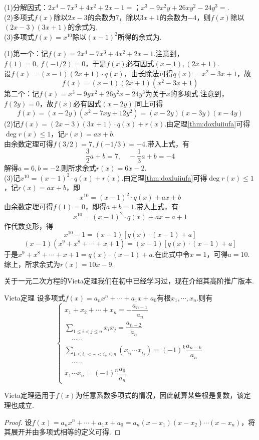 \documentclass[lang=cn, zihao=5]{elegantbook}
\newcommand{\tk}{\uline{\hspace{4em}}}
\begin{document}
\begin{example}
	(1)分解因式：$2x^4-7x^3+4x^2+2x-1=$\tk ；$x^3-9x^2y+26xy^2-24y^3=$\tk . \\
	(2)多项式$f(x)$除以$2x-3$的余数为$7$，除以$3x+1$的余数为$-4$，则$f(x)$除以$(2x-3)(3x+1)$的余式为\tk . \\
	(3)多项式$f(x)=x^{10}$除以$(x-1)^2$所得的余式为\tk .
\end{example}
\begin{solution}
	(1)第一个：记$f(x)=2x^4-7x^3+4x^2+2x-1$.注意到，$f(1)=0,~f(-1/2)=0$，于是$f(x)$必有因式$(x-1),(2x+1)$. \\
	设$f(x)=(x-1)(2x+1) \cdot q(x)$，由长除法可得$q(x)=x^2-3x+1$，故$$f(x)=(x-1)(2x+1)(x^2-3x+1)$$
	第二个：记$f(x)=x^3-9yx^2+26y^2x-24y^3$为关于$x$的多项式.注意到，$f(2y)=0$，故$f(x)$必有因式$(x-2y)$.同上可得$$f(x)=(x-2y)(x^2-7xy+12y^2)=(x-2y)(x-3y)(x-4y)$$
	(2)记$f(x)=(2x-3)(3x+1) \cdot q(x) + r(x)$.由定理\ref{thm:doxluiiufa}可得$\deg r(x) \leq 1$，记$r(x)=ax+b$. \\
	由余数定理可得$f(3/2)=7,f(-1/3)=-4$.带入上式，有$$\frac{3}{2}a+b=7,\quad -\frac{1}{3}a+b=-4$$
	解得$a=6,b=-2$.则所求余式$r(x)=6x-2$. \\
	(3)记$x^{10}=(x-1)^2 \cdot q(x) + r(x)$.由定理\ref{thm:doxluiiufa}可得$\deg r(x) \leq 1$，记$r(x)=ax+b$，即$$x^{10} = (x-1)^2 \cdot q(x) + ax+b$$
	由余数定理可得$f(1)=0$，即得$a+b=1$.带入上式，有$$x^{10} = (x-1)^2 \cdot q(x) + ax-a+1$$
	作代数变形，得
	$$x^{10}-1 = (x-1)[q(x) \cdot (x-1)+a]$$
	$$(x-1)(x^9+x^8+ \cdots +x+1) = (x-1)[q(x) \cdot (x-1)+a]$$
	于是$x^9+x^8+ \cdots +x+1 = q(x) \cdot (x-1)+a$.在此式中令$x=1$，可得$a=10$. \\
	综上，所求余式为$r(x)=10x-9$.
\end{solution}

关于一元二次方程的Vieta定理我们在初中已经学习过，现在介绍其高阶推广版本.

\begin{theorem}{Vieta定理}
	设多项式$f(x)=a_nx^n + \cdots + a_1x + a_0$有根$x_1, \cdots ,x_n$.则有$$\begin{cases}
		x_1+x_2+ \cdots + x_n=-\dfrac{a_{n-1}}{a_n} \\
		{\displaystyle \sum_{1 \leq i < j \leq n} x_ix_j} = \dfrac{a_{n-2}}{a_n} \\
		\quad \cdots \cdots \\
		{\displaystyle \sum_{1 \leq i_1 < \cdots < i_k \leq n} (x_{i_1} \cdots x_{i_k})} = (-1)^{k} \dfrac{a_{n-k}}{a_n} \\
		\quad \cdots \cdots \\
		x_1 \cdots x_n = (-1)^{n} \dfrac{a_0}{a_n}
	\end{cases}$$
\end{theorem}
\begin{remark}
	Vieta定理适用于$f(x)$为任意系数多项式的情况，因此就算某些根是复数，该定理也成立.
\end{remark}
\begin{proof}
	设$f(x)=a_nx^n + \cdots + a_1x + a_0=a_n(x-x_1)(x-x_2) \cdots (x-x_n)$，将其展开并由多项式相等的定义可得.
\end{proof}
\end{document}
